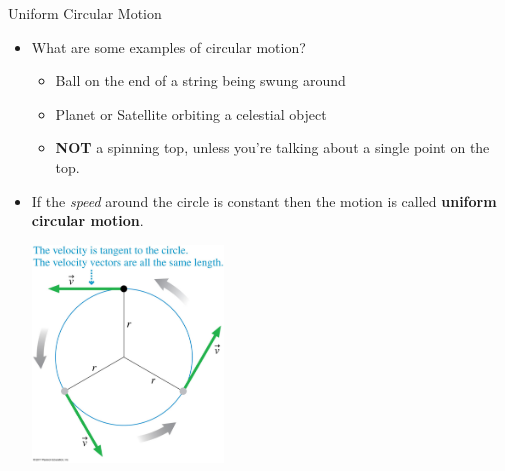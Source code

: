 \documentclass{beamer}
\begin{document}
\begin{frame}{Uniform Circular Motion}
\begin{itemize}
   \item What are some examples of circular motion?
   \begin{itemize}
      \item<2-> Ball on the end of a string being swung around
      \item<2-> Planet or Satellite orbiting a celestial object
      \item<2-> {\bf NOT} a spinning top, unless you're talking about a single point on the top.
   \end{itemize}
   \item<3-> If the {\it speed} around the circle is constant then the motion is called {\bf uniform circular motion}.
   \begin{center}
      \includegraphics[width=0.4\textwidth]{../figures/04_21_Figure.jpg}
   \end{center}
\end{itemize}
\end{frame}
\end{document}
